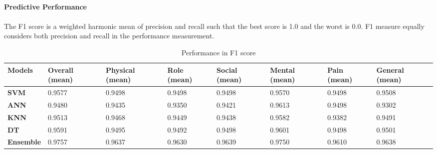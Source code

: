 \documentclass[runningheads]{llncs}
\begin{document}
\paragraph{Predictive Performance}
%
%
\paragraph{}
The F1 score is a weighted harmonic mean of precision and recall such that the best score is 1.0 and the worst is 0.0. F1 measure equally considers both precision and recall in the performance measurement.
\begin{table}[h]
\begin{tabular}{|C{2cm}|C{1.5cm}|C{1.5cm}|C{1.5cm}|C{1.5cm}|C{1.5cm}|C{1.5cm}|C{1.5cm}|}
\hline
{} 
{\color[HTML]{333333} \textbf{Models}} & {\color[HTML]{333333} \textbf{Overall (mean)}} & {\color[HTML]{333333} \textbf{Physical (mean)}} & {\color[HTML]{333333} \textbf{Role (mean)}} &{\color[HTML]{333333} \textbf{Social (mean)}} & {\color[HTML]{333333} \textbf{Mental (mean)}} & {\color[HTML]{333333} \textbf{Pain (mean)}} & {\color[HTML]{333333} \textbf{General (mean)}} \\ \hline
{} 
\textbf{SVM} & 0.9577  & 0.9498 & 0.9498  & 0.9498  & 0.9570  & 0.9498 & 0.9508 \\ \hline
{} 
\textbf{ANN} & 0.9480  & 0.9435  & 0.9350  & 0.9421 & 0.9613 & 0.9498 & 0.9302 \\ \hline
{} 
\textbf{KNN} & 0.9513  & 0.9468 & 0.9449 & 0.9438 & 0.9582 & 0.9382 & 0.9491 \\ \hline
{} 
\textbf{DT} & 0.9591 & 0.9495  & 0.9492 & 0.9498  & 0.9601  & 0.9498 & 0.9501  \\ \hline
{} 
\textbf{Ensemble}  & 0.9757  & 0.9637  & 0.9630  & 0.9639 & 0.9750 & 0.9610 & 0.9638  \\ \hline
\end{tabular}
\caption{Performance in F1 score}
\label{F1}
\end{table}
%
%
\end{document}
